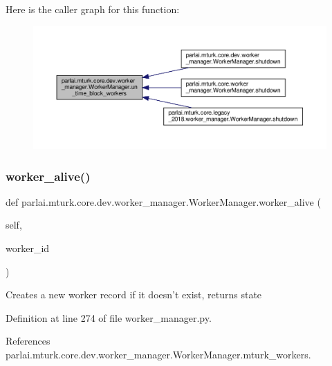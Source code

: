 Here is the caller graph for this function\+:
\nopagebreak
\begin{figure}[H]
\begin{center}
\leavevmode
\includegraphics[width=350pt]{classparlai_1_1mturk_1_1core_1_1dev_1_1worker__manager_1_1WorkerManager_a0cd13932ce8ffc3d6d794b4149ff5a42_icgraph}
\end{center}
\end{figure}
\mbox{\label{classparlai_1_1mturk_1_1core_1_1dev_1_1worker__manager_1_1WorkerManager_a4ac41d78677e2ad337be38ee4d68cea3}} 
\subsubsection{\texorpdfstring{worker\+\_\+alive()}{worker\_alive()}}
{\footnotesize\ttfamily def parlai.\+mturk.\+core.\+dev.\+worker\+\_\+manager.\+Worker\+Manager.\+worker\+\_\+alive (\begin{DoxyParamCaption}\item[{}]{self,  }\item[{}]{worker\+\_\+id }\end{DoxyParamCaption})}

\begin{DoxyVerb}Creates a new worker record if it doesn't exist, returns state\end{DoxyVerb}
 

Definition at line 274 of file worker\+\_\+manager.\+py.



References parlai.\+mturk.\+core.\+dev.\+worker\+\_\+manager.\+Worker\+Manager.\+mturk\+\_\+workers.



